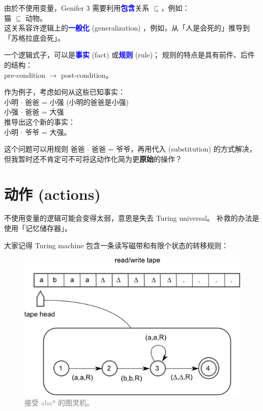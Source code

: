 \documentclass[12pt]{article}
\newcommand{\concept}[1]{\textbf{\textcolor{blue}{#1}}}
\newcommand{\formula}[1]{\textcolor{LogicColor}{#1}}
\newcommand{\tab}{\hspace*{1cm}}
\begin{document}
由於不使用变量，Genifer 3 需要利用\concept{包含}关系 $\subseteq$，例如：\\
\tab \formula{猫 $\subseteq$ 动物}。\\
这关系容许逻辑上的\concept{一般化} (generalization) ，例如，从「人是会死的」推导到「苏格拉底会死」。

一个逻辑式子，可以是\concept{事实} (fact) 或\concept{规则} (rule)；  规则的特点是具有前件、后件的结构：\\
\tab \formula{pre-condition $\rightarrow$ post-condition}。

作为例子，考虑如何从这些已知事实：\\
\tab \formula{小明 $\cdot$ 爸爸 = 小强} \tab (小明的爸爸是小强)\\
\tab \formula{小强 $\cdot$ 爸爸 = 大强}\\
推导出这个新的事实：\\
\tab \formula{小明 $\cdot$ 爷爷 = 大强}。

这个问题可以用规则 \formula{爸爸 $\cdot$ 爸爸 = 爷爷}，再用代入 (substitution) 的方式解决，但我暂时还不肯定可不可将这动作化简为更\textbf{原始}的操作？

\section{动作 (actions)}

不使用变量的逻辑可能会变得太弱，意思是失去 Turing universal。  补救的办法是使用「记忆储存器」。 

大家记得 Turing machine 包含一条读写磁带和有限个状态的转移规则：
\begin{figure}[H]
\centering
\includegraphics[scale=0.75]{Turing-machine.png}
\caption{\textcolor{grey}{接受 aba* 的图灵机。}}
\end{figure}
\end{document}
